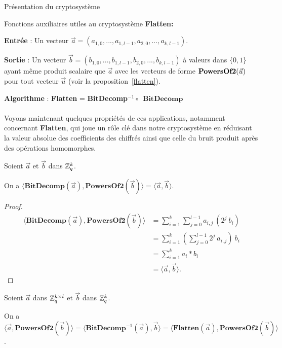\begin{section}{Présentation du cryptosystème}
\begin{subsection}{Fonctions auxiliaires utiles au cryptosystème}
\vspace{0.5cm}\noindent\textbf{Flatten:}
\flushleft

	\textbf{Entrée} : Un vecteur $\vec{a} = (a_{1,0}, ..., a_{1,l-1}, a_{2,0}, ..., a_{k,l-1})$.

	\textbf{Sortie} : Un vecteur $\vec{b} = (b_{1,0}, ..., b_{1,l-1}, b_{2,0}, ..., b_{k,l-1})$ à valeurs dans 
	$\{0,1\}$ ayant même produit scalaire que $\vec{a}$ avec les vecteurs de forme
	$\text{\textbf{PowersOf2}}(\vec{u})$ pour tout vecteur $\vec{u}$ (voir la proposition~\ref{flatten}).

	\textbf{Algorithme} : \textbf{Flatten} = \textbf{BitDecomp}$^{-1} \circ\:\: \textbf{BitDecomp}$

\paragraph{}
	Voyons maintenant quelques propriétés de ces applications, notamment concernant \textbf{Flatten}, qui joue un rôle clé dans notre cryptosystème en réduisant la valeur absolue des coefficients des chiffrés ainsi que celle du bruit produit après des opérations homomorphes.

	\begin{prop}
	Soient $\vec{a}$ et $\vec{b}$ dans $\mathbb{Z}_q^{k}$.

	On a $\langle \textbf{BitDecomp}(\vec{a}), \textbf{PowersOf2}(\vec{b}) \rangle = \langle\vec{a},\vec{b} \rangle$.
	\end{prop}

	\begin{proof}
	\begin{align*}
	\langle \textbf{BitDecomp}(\vec{a}), \textbf{PowersOf2}(\vec{b}) \rangle &= \sum\limits_{i=1}^{k}
	\sum\limits_{j=0}^{l-1} a_{i,j} \:(2^{j} \:b_i) \\
	&= \sum\limits_{i=1}^{k} \left(\sum\limits_{j=0}^{l-1} 2^j \:a_{i,j} \right) \: b_i \\ 
	&= \sum\limits_{i=1}^{k} a_i * b_i \\
	&= \langle\vec{a},\vec{b} \rangle.
	\end{align*}
	\end{proof}
	
	\begin{prop} \label{flatten}
	Soient $\vec{a}$ dans $\mathbb{Z}_q^{k \times l}$ et $\vec{b}$ dans $\mathbb{Z}_q^{k}$.

	On a $\langle \vec{a}, \textbf{PowersOf2}(\vec{b}) \rangle = \langle \textbf{BitDecomp}^{-1}(\vec{a}), \vec{b}\rangle = \langle \textbf{Flatten}(\vec{a}),\textbf{PowersOf2}(\vec{b}) \rangle$.
	\end{prop}


\end{subsection}
\end{section}
